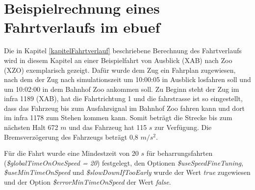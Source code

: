 \section{Beispielrechnung eines Fahrtverlaufs im \ac{ebuef}} \label{beispielrechnungKapitel}
Die in Kapitel \ref{kapitelFahrtverlauf} beschriebene Berechnung des Fahrtverlaufs wird in diesem Kapitel an einer Beispielfahrt von Ausblick (XAB) nach Zoo (XZO) exemplarisch gezeigt. Dafür wurde dem Zug ein Fahrplan zugewiesen, nach dem der Zug nach \Gls{simulationszeit} um 10:00:05 in Ausblick losfahren soll und um 10:02:00 in dem Bahnhof Zoo ankommen soll. Zu Beginn steht der Zug im \ac{infra} 1189 (XAB), hat die Fahrtrichtung 1 und die \Gls{fahrstrasse} ist so eingestellt, dass das Fahrzeug bis zum Ausfahrsignal im Bahnhof Zoo fahren kann und dort im \ac{infra} 1178 zum Stehen kommen kann. Somit beträgt die Strecke bis zum nächsten Halt 672 $m$ und das Fahrzeug hat 115 $s$ zur Verfügung. Die Bremsverzögerung des Fahrzeugs beträgt 0,8 $m/s^{2}$.

Für die Fahrt wurde eine Mindestzeit von 20 $s$ für \Gls{beharrungsfahrt}en (\textit{\$glo\-bal\-Time\-On\-One\-Speed = 20}) festgelegt, den Optionen \textit{\$useSpeedFineTuning}, \textit{\$useMinTimeOnSpeed} und \textit{\$slowDownIfTooEarly} wurde der Wert \textit{true} zugewiesen und der Option \textit{\$errorMinTimeOnSpeed} der Wert \textit{false}.

